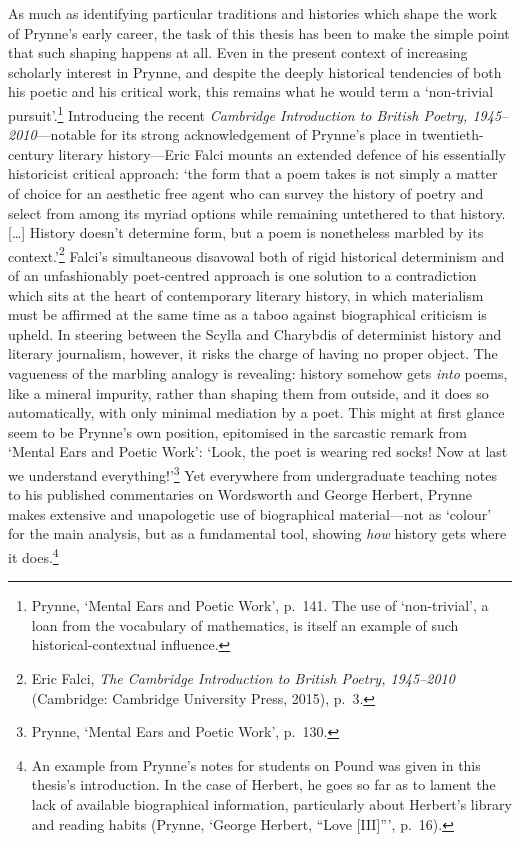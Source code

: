 \documentclass[]{article}
\begin{document}
\noindent As much as identifying particular traditions and histories
which shape the work of Prynne’s early career, the task of this thesis
has been to make the simple point that such shaping happens at all. Even
in the present context of increasing scholarly interest in Prynne, and
despite the deeply historical tendencies of both his poetic and his
critical work, this remains what he would term a ‘non-trivial
pursuit’.\footnote{Prynne, ‘Mental Ears and Poetic Work’, p.~141. The
  use of ‘non-trivial’, a loan from the vocabulary of mathematics, is
  itself an example of such historical-contextual influence.}
Introducing the recent \emph{Cambridge Introduction to British Poetry,
1945–2010}—notable for its strong acknowledgement of Prynne’s place in
twentieth-century literary history—Eric Falci mounts an extended defence
of his essentially historicist critical approach: ‘the form that a poem
takes is not simply a matter of choice for an aesthetic free agent who
can survey the history of poetry and select from among its myriad
options while remaining untethered to that history. {[}\ldots{}{]}
History doesn’t determine form, but a poem is nonetheless marbled by its
context.’\footnote{Eric Falci, \emph{The Cambridge Introduction to
  British Poetry, 1945–2010} (Cambridge: Cambridge University Press,
  2015), p.~3.} Falci’s simultaneous disavowal both of rigid historical
determinism and of an unfashionably poet-centred approach is one
solution to a contradiction which sits at the heart of contemporary
literary history, in which materialism must be affirmed at the same time
as a taboo against biographical criticism is upheld. In steering between
the Scylla and Charybdis of determinist history and literary journalism,
however, it risks the charge of having no proper object. The vagueness
of the marbling analogy is revealing: history somehow gets \emph{into}
poems, like a mineral impurity, rather than shaping them from outside,
and it does so automatically, with only minimal mediation by a poet.
This might at first glance seem to be Prynne’s own position, epitomised
in the sarcastic remark from ‘Mental Ears and Poetic Work’: ‘Look, the
poet is wearing red socks! Now at last we understand
everything!’\footnote{Prynne, ‘Mental Ears and Poetic Work’, p.~130.}
Yet everywhere from undergraduate teaching notes to his published
commentaries on Wordsworth and George Herbert, Prynne makes extensive
and unapologetic use of biographical material—not as ‘colour’ for the
main analysis, but as a fundamental tool, showing \emph{how} history
gets where it does.\footnote{An example from Prynne’s notes for students
  on Pound was given in this thesis’s introduction. In the case of
  Herbert, he goes so far as to lament the lack of available
  biographical information, particularly about Herbert’s library and
  reading habits (Prynne, ‘George Herbert, “Love {[}III{]}”’, p.~16).}
\end{document}
